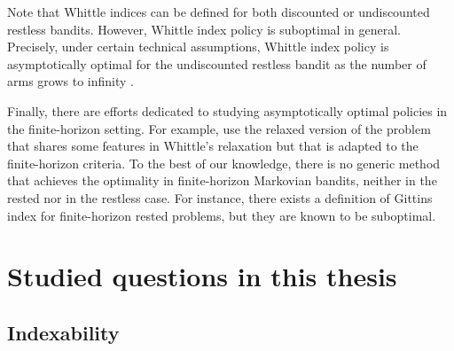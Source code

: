 Note that Whittle indices can be defined for both discounted or undiscounted restless bandits.
However, Whittle index policy is suboptimal in general.
Precisely, under certain technical assumptions, Whittle index policy is asymptotically optimal for the undiscounted restless bandit as the number of arms grows to infinity \cite{weber1990index}.

Finally, there are efforts dedicated to studying asymptotically optimal policies in the finite-horizon setting.
For example, \cite{hu2017asymptotically,brown2020index,zhang2021restless,gastGaujalYan-lpbased} use the relaxed version of the problem that shares some features in Whittle's relaxation but that is adapted to the finite-horizon criteria.
To the best of our knowledge, there is no generic method that achieves the optimality in finite-horizon Markovian bandits, neither in the rested nor in the restless case.
For instance, there exists a definition of Gittins index for finite-horizon rested problems, but they are known to be suboptimal. 



\section{Studied questions in this thesis}
\label{ch:mb:sec:studied}

\subsection{Indexability}

